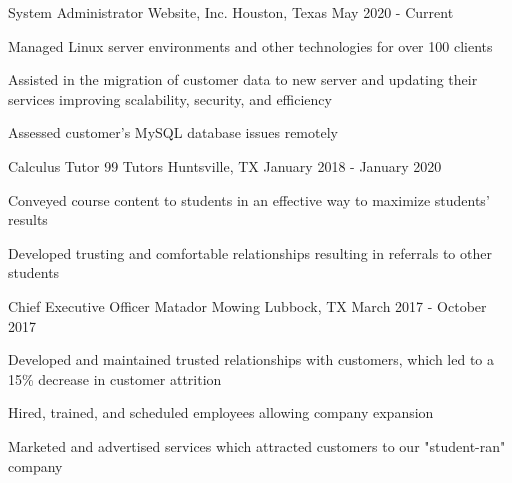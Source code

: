     \begin{cventries}

          \cventry
            {System Administrator} %
            {Website, Inc.} %
            {Houston, Texas} %
            {May 2020 - Current} %
            {
              \begin{cvitems} %
                \item {Managed Linux server environments and other technologies for over 100 clients}
                \item {Assisted in the migration of customer data to new server and updating their services improving scalability, security, and efficiency}
                \item {Assessed customer's MySQL database issues remotely }
              \end{cvitems}
            }

          \cventry
            {Calculus Tutor} 		%
            {99 Tutors} 			%
            {Huntsville, TX} %
            {January 2018 - January 2020} %
            {
              \begin{cvitems} %
                \item {Conveyed course content to students in an effective way to maximize students' results}
                \item {Developed trusting and comfortable relationships resulting in referrals to other students}
              \end{cvitems}
            }

          \cventry
            {Chief Executive Officer} %
            {Matador Mowing} %
            {Lubbock, TX} %
            {March 2017 - October 2017} %
            {
              \begin{cvitems} %
                \item {Developed and maintained trusted relationships with customers, which led to a 15\% decrease in customer attrition}
                \item {Hired, trained, and scheduled employees allowing company expansion}
               \item {Marketed and advertised services which attracted customers to our "student-ran" company}
              \end{cvitems}
            }


\end{cventries}
